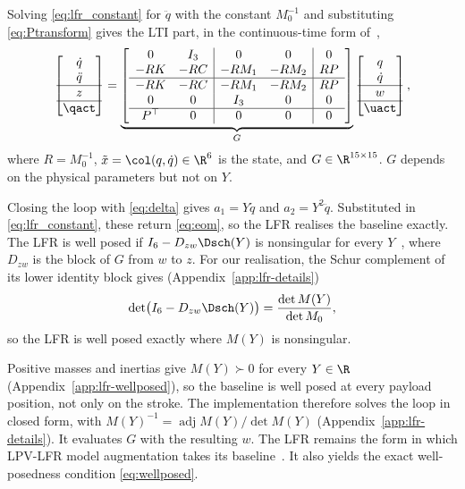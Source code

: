 Solving \eqref{eq:lfr_constant} for $\ddot q$ with the constant $M_0^{-1}$
and substituting \eqref{eq:Ptransform} gives the LTI part, in the
continuous-time form of~\cite[Eq.~(2.1)]{drenth2025thesis},
{\small
\setlength{\arraycolsep}{2.5pt}
\begin{equation}
  \begin{bmatrix}\dot q\\ \ddot q\\ \hline z\\ \hline \qact\end{bmatrix}
  =\underbrace{\left[\begin{array}{cc|cc|c}
  0&I_3&0&0&0\\
  -RK&-RC&-RM_1&-RM_2&RP\\ \hline
  -RK&-RC&-RM_1&-RM_2&RP\\
  0&0&I_3&0&0\\ \hline
  P^\top&0&0&0&0
  \end{array}\right]}_{G}
  \begin{bmatrix}q\\ \dot q\\ \hline w\\ \hline \uact\end{bmatrix},
  \label{eq:lfr_G}
\end{equation}
}
where $R=M_0^{-1}$, $\tilde x=\col(q,\dot q)\in\R^6$ is the state, and
$G\in\R^{15\times15}$.
$G$ depends on the physical parameters but not on $Y$.

Closing the loop with \eqref{eq:delta} gives $a_1=Y\ddot q$ and
$a_2=Y^2\ddot q$.
Substituted in \eqref{eq:lfr_constant}, these return \eqref{eq:eom}, so the
LFR realises the baseline exactly.
The LFR is well posed if $I_6-D_{zw}\Dsch(Y)$ is nonsingular for every
$Y$~\cite[Sec.~2.1]{drenth2025thesis}, where $D_{zw}$ is the block of $G$
from $w$ to $z$.
For our realisation, the Schur complement of its lower identity block gives
(Appendix~\ref{app:lfr-details})
\begin{equation}
  \det\bigl(I_6-D_{zw}\Dsch(Y)\bigr)=\frac{\det M(Y)}{\det M_0},
  \label{eq:wellposed}
\end{equation}
so the LFR is well posed exactly where $M(Y)$ is nonsingular.

Positive masses and inertias give $M(Y)\succ0$ for every $Y\in\R$
(Appendix~\ref{app:lfr-wellposed}), so the baseline is well posed at every
payload position, not only on the stroke.
The implementation therefore solves the loop in closed form, with
$M(Y)^{-1}=\operatorname{adj}M(Y)/\det M(Y)$
(Appendix~\ref{app:lfr-details}).
It evaluates $G$ with the resulting $w$.
The LFR remains the form in which LPV-LFR model augmentation takes its
baseline~\cite[Sec.~5.2, Eq.~(5.1)]{drenth2025thesis}.
It also yields the exact well-posedness condition \eqref{eq:wellposed}.

